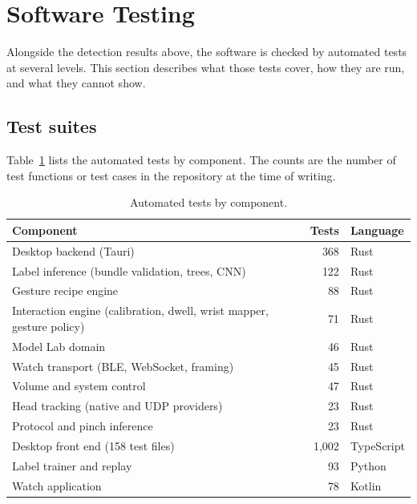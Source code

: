 \section{Software Testing}\label{sec:software-testing}

Alongside the detection results above, the software is checked by automated tests at several levels. This section describes what those tests cover, how they are run, and what they cannot show.

\subsection{Test suites}

Table~\ref{tab:tests} lists the automated tests by component. The counts are the number of test functions or test cases in the repository at the time of writing.

\begin{table}[htbp]
\centering
\caption{Automated tests by component.}\label{tab:tests}
\begin{tabularx}{\linewidth}{@{}>{\raggedright\arraybackslash}X r l@{}}
\toprule
\textbf{Component} & \textbf{Tests} & \textbf{Language} \\
\midrule
Desktop backend (Tauri) & 368 & Rust \\
Label inference (bundle validation, trees, CNN) & 122 & Rust \\
Gesture recipe engine & 88 & Rust \\
Interaction engine (calibration, dwell, wrist mapper, gesture policy) & 71 & Rust \\
Model Lab domain & 46 & Rust \\
Watch transport (BLE, WebSocket, framing) & 45 & Rust \\
Volume and system control & 47 & Rust \\
Head tracking (native and UDP providers) & 23 & Rust \\
Protocol and pinch inference & 23 & Rust \\
Desktop front end (158 test files) & 1,002 & TypeScript \\
Label trainer and replay & 93 & Python \\
Watch application & 78 & Kotlin \\
\bottomrule
\end{tabularx}
\end{table}

